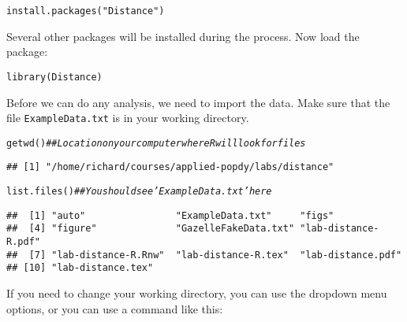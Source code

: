\documentclass[12pt]{article}\usepackage[]{graphicx}\usepackage[]{color}
\makeatletter
\newcommand{\hlstr}[1]{\textcolor[rgb]{0.749,0.012,0.012}{#1}}%
\newcommand{\hlcom}[1]{\textcolor[rgb]{0.514,0.506,0.514}{\textit{#1}}}%
\newcommand{\hlstd}[1]{\textcolor[rgb]{0,0,0}{#1}}%
\newcommand{\hlkwd}[1]{\textcolor[rgb]{0.004,0.004,0.506}{#1}}%
\newenvironment{kframe}{%
 \def\at@end@of@kframe{}%
 \ifinner\ifhmode%
  \def\at@end@of@kframe{\end{minipage}}%
  \begin{minipage}{\columnwidth}%
 \fi\fi%
 \def\FrameCommand##1{\hskip\@totalleftmargin \hskip-\fboxsep
 \colorbox{shadecolor}{##1}\hskip-\fboxsep
     \hskip-\linewidth \hskip-\@totalleftmargin \hskip\columnwidth}%
 \MakeFramed {\advance\hsize-\width
   \@totalleftmargin\z@ \linewidth\hsize
   \@setminipage}}%
 {\par\unskip\endMakeFramed%
 \at@end@of@kframe}
\newenvironment{knitrout}{}{} %
\makeatother
\begin{document}
\begin{knitrout}
\color{fgcolor}\begin{kframe}
\begin{alltt}
\hlkwd{install.packages}\hlstd{(}\hlstr{"Distance"}\hlstd{)}
\end{alltt}
\end{kframe}
\end{knitrout}

Several other packages will be installed during the process. Now
load the package: 

\begin{knitrout}
\color{fgcolor}\begin{kframe}
\begin{alltt}
\hlkwd{library}\hlstd{(Distance)}
\end{alltt}
\end{kframe}
\end{knitrout}

Before we can do any analysis, we need to import the 
data. Make sure that the file \texttt{ExampleData.txt} is in your
working directory.

\begin{knitrout}
\color{fgcolor}\begin{kframe}
\begin{alltt}
\hlkwd{getwd}\hlstd{()}       \hlcom{## Location on your computer where R will look for files}
\end{alltt}
\begin{verbatim}
## [1] "/home/richard/courses/applied-popdy/labs/distance"
\end{verbatim}
\begin{alltt}
\hlkwd{list.files}\hlstd{()}  \hlcom{## You should see 'ExampleData.txt' here}
\end{alltt}
\begin{verbatim}
##  [1] "auto"                "ExampleData.txt"     "figs"               
##  [4] "figure"              "GazelleFakeData.txt" "lab-distance-R.pdf" 
##  [7] "lab-distance-R.Rnw"  "lab-distance-R.tex"  "lab-distance.pdf"   
## [10] "lab-distance.tex"
\end{verbatim}
\end{kframe}
\end{knitrout}

If you need to change your working directory, you can use the dropdown
menu options, or you can use a command like this:
\end{document}
